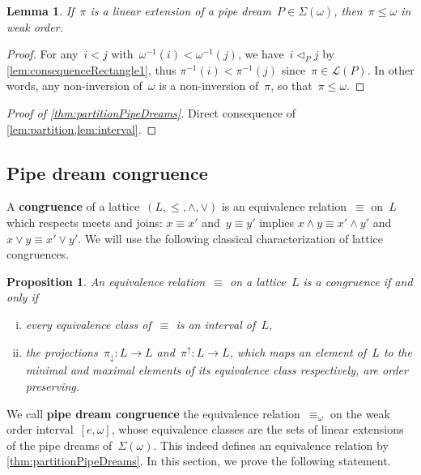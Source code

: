 \documentclass{amsart}
\newtheorem{proposition}[theorem]{Proposition}
\newtheorem{lemma}[theorem]{Lemma}
\theoremstyle{definition}
\newcommand{\defn}[1]{\textbf{\textsf{\color{PineGreen} #1}}} %
\newcommand{\acyclicPipeDreams}{\Sigma} %
\newcommand{\linearExtensions}{\mathcal{L}} %
\newcommand{\meet}{\wedge} %
\newcommand{\join}{\vee} %
\newcommand{\less}{\vartriangleleft} %
\newcommand{\contactLess}[1]{\less_{#1}} %
\newcommand{\projDown}{\pi_\downarrow} %
\newcommand{\projUp}{\pi^\uparrow} %
\begin{document}
\begin{lemma}
\label{lem:interval}
If~$\pi$ is a linear extension of a pipe dream~$P \in \acyclicPipeDreams(\omega)$, then~$\pi \le \omega$ in weak order.
\end{lemma}

\begin{proof}
For any~$i < j$ with~$\omega^{-1}(i) < \omega^{-1}(j)$, we have~$i \contactLess{P} j$ by \cref{lem:consequenceRectangle1}, thus ${\pi^{-1}(i) < \pi^{-1}(j)}$ since~$\pi \in \linearExtensions(P)$.
In other words, any non-inversion of~$\omega$ is a non-inversion of~$\pi$, so that~${\pi \le \omega}$.
\end{proof}

\begin{proof}[Proof of \cref{thm:partitionPipeDreams}]
Direct consequence of \cref{lem:partition,lem:interval}.
\end{proof}


\subsection{Pipe dream congruence}
\label{subsec:pipeDreamCongruence}

A \defn{congruence} of a lattice~$(L, \le, \meet, \join)$ is an equivalence relation~$\equiv$ on~$L$ which respects meets and joins: $x \equiv x'$ and~$y \equiv y'$ implies $x \meet y \equiv x' \meet y'$ and~$x \join y \equiv x' \join y'$.
We will use the following classical characterization of lattice congruences.

\begin{proposition}
\label{prop:characterizationCongruences}
An equivalence relation~$\equiv$ on a lattice~$L$ is a congruence if and only if
\begin{enumerate}[(i)]
\item every equivalence class of~$\equiv$ is an interval of~$L$,
\item the projections~$\projDown : L \to L$ and~$\projUp : L \to L$, which maps an element of~$L$ to the minimal and maximal elements of its equivalence class respectively, are order preserving.
\end{enumerate}
\end{proposition}

We call \defn{pipe dream congruence} the equivalence relation~$\equiv_\omega$ on the weak order interval~$[e,\omega]$, whose equivalence classes are the sets of linear extensions of the pipe dreams of~$\acyclicPipeDreams(\omega)$.
This indeed defines an equivalence relation by \cref{thm:partitionPipeDreams}.
In this section, we prove the following statement.
\end{document}
